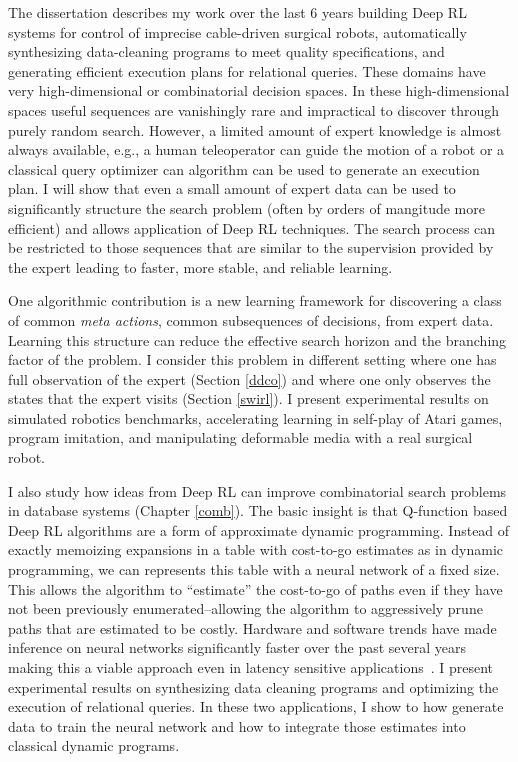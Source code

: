 The dissertation describes my work over the last 6 years building Deep RL systems for control of imprecise cable-driven surgical robots, automatically synthesizing data-cleaning programs to meet quality specifications, and generating efficient execution plans for relational queries. 
These domains have very high-dimensional or combinatorial decision spaces. In these high-dimensional spaces useful sequences are vanishingly rare and impractical to discover through purely random search.
However, a limited amount of expert knowledge is almost always available, e.g., a human teleoperator can guide the motion of a robot or a classical query optimizer can algorithm can be used to generate an execution plan. 
I will show that even a small amount of expert data can be used to significantly structure the search problem (often by orders of mangitude more efficient) and allows application of Deep RL techniques.
The search process can be restricted to those sequences that are similar to the supervision provided by the expert leading to faster, more stable, and reliable learning.

One algorithmic contribution is a new learning framework for discovering a class of common \emph{meta actions}, common subsequences of decisions, from expert data. Learning this structure can reduce the effective search horizon and the branching factor of the problem. I consider this problem in different setting where one has full observation of the expert (Section \ref{ddco}) and where one only observes the states that the expert visits (Section \ref{swirl}). I present experimental results on simulated robotics benchmarks, accelerating learning in self-play of Atari games, program imitation, and manipulating deformable media with a real surgical robot.

I also study how ideas from Deep RL can improve combinatorial search problems in database systems (Chapter \ref{comb}).
The basic insight is that Q-function based Deep RL algorithms are a form of approximate dynamic programming.
Instead of exactly memoizing expansions in a table with cost-to-go estimates as in dynamic programming, we can represents this table with a neural network of a fixed size.
This allows the algorithm to ``estimate'' the cost-to-go of paths even if they have not been previously enumerated--allowing the algorithm to aggressively prune paths that are estimated to be costly.
Hardware and software trends have made inference on neural networks significantly faster over the past several years making this a viable approach even in latency sensitive applications~\cite{tpu}.
I present experimental results on synthesizing data cleaning programs and optimizing the execution of relational queries.
In these two applications, I show to how generate data to train the neural network and how to integrate those estimates into classical dynamic programs.



